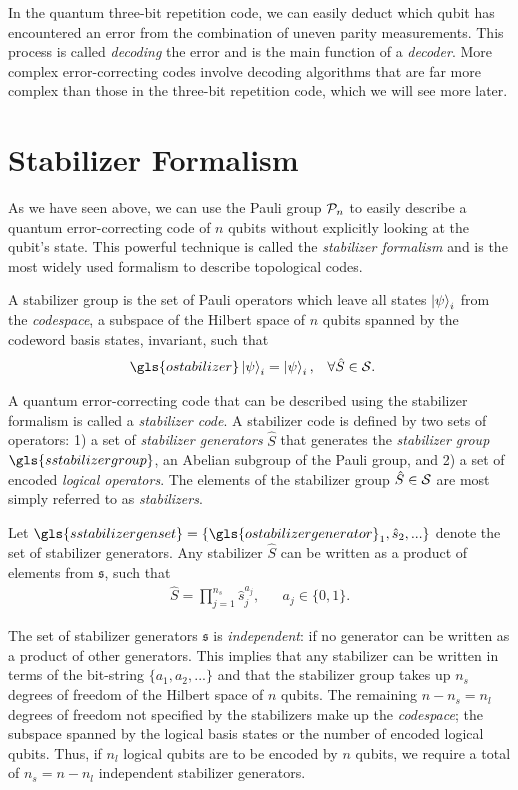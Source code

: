 In the quantum three-bit repetition code, we can easily deduct which qubit has encountered an error from the combination of uneven parity measurements. This process is called \emph{decoding} the error and is the main function of a \emph{decoder}. More complex error-correcting codes involve decoding algorithms that are far more complex than those in the three-bit repetition code, which we will see more later.


\section{Stabilizer Formalism}\label{sec:stabilizerformalism}

As we have seen above, we can use the Pauli group $\mathcal{P}_n$ to easily describe a quantum error-correcting code of $n$ qubits without explicitly looking at the qubit's state. This powerful technique is called the \emph{stabilizer formalism} \cite{gottesman1997stabilizer} and is the most widely used formalism to describe topological codes.

\begin{definition}\label{def:stabilizer}
  A stabilizer group is the set of Pauli operators which leave all states $\ket{\psi}_i$ from the \emph{codespace}, a subspace of the Hilbert space of $n$ qubits spanned by the codeword basis states, invariant, such that
\begin{align}
  & \gls{ostabilizer}\ket{\psi}_i = \ket{\psi}_i, && \forall \hat{S} \in \m{S}. &
\end{align}
\end{definition}
A quantum error-correcting code that can be described using the stabilizer formalism is called a \emph{stabilizer code}. A stabilizer code is defined by two sets of operators: 1) a set of \emph{stabilizer generators} $\hat{S}$ that generates the \emph{stabilizer group} $\gls{sstabilizergroup}$, an Abelian subgroup of the Pauli group, and 2) a set of encoded \emph{logical operators}. The elements of the stabilizer group $\hat{S}\in\mathcal{S}$ are most simply referred to as \emph{stabilizers}. 
\begin{definition}\label{def:stabilizergen}
  Let $\gls{sstabilizergenset}=\{\gls{ostabilizergenerator}_1,\hat{s}_2,...\}$ denote the set of stabilizer generators. Any stabilizer $\hat{S}$ can be written as a product of elements from $\mathfrak{s}$, such that 
  \begin{align}
  & \hat{S} = \prod_{j=1}^{n_s}\hat{s}_j^{a_j}, && a_j \in \{0, 1\}. &
  \end{align}
\end{definition}
The set of stabilizer generators $\mathfrak{s}$ is \emph{independent}: if no generator can be written as a product of other generators. This implies that any stabilizer can be written in terms of the bit-string $\{a_1, a_2, ...\}$ and that the stabilizer group takes up $n_s$ degrees of freedom of the Hilbert space of $n$ qubits. The remaining $n-n_s = n_l$ degrees of freedom not specified by the stabilizers make up the \emph{codespace}; the subspace spanned by the logical basis states or the number of encoded logical qubits. Thus, if $n_l$ logical qubits are to be encoded by $n$ qubits, we require a total of $n_s= n-n_l$ independent stabilizer generators.


